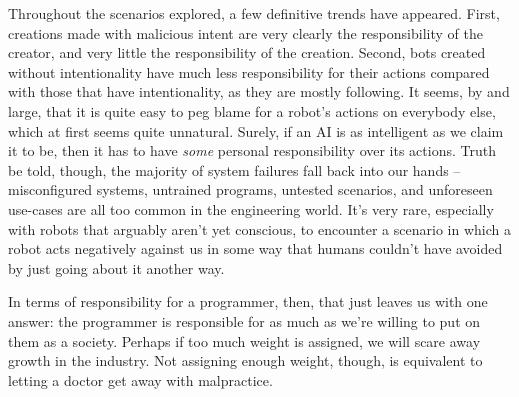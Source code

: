 \documentclass[12]{article}
\begin{document}
	Throughout the scenarios explored, a few definitive trends have appeared. First, creations made with malicious intent are very clearly the responsibility of the creator, and very little the responsibility of the creation. Second, bots created without intentionality have much less responsibility for their actions compared with those that have intentionality, as they are mostly following. It seems, by and large, that it is quite easy to peg blame for a robot's actions on everybody else, which at first seems quite unnatural. Surely, if an AI is as intelligent as we claim it to be, then it has to have \textit{some} personal responsibility over its actions. Truth be told, though, the majority of system failures fall back into our hands -- misconfigured systems, untrained programs, untested scenarios, and unforeseen use-cases are all too common in the engineering world. It's very rare, especially with robots that arguably aren't yet conscious, to encounter a scenario in which a robot acts negatively against us in some way that humans couldn't have avoided by just going about it another way.
	
	In terms of responsibility for a programmer, then, that just leaves us with one answer: the programmer is responsible for as much as we're willing to put on them as a society. Perhaps if too much weight is assigned, we will scare away growth in the industry. Not assigning enough weight, though, is equivalent to letting a doctor get away with malpractice.

\newpage

\printbibliography[title={References}]
\end{document}
